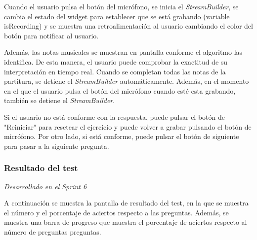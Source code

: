 Cuando el usuario pulsa el botón del micrófono, se inicia el \textit{StreamBuilder}, se cambia el estado del widget para establecer 
que se está grabando (variable isRecording) y se muestra una retroalimentación al usuario cambiando el color del botón para notificar al usuario.

Además, las notas musicales se muestran en pantalla conforme el algoritmo las identifica. De esta manera, el usuario puede comprobar la exactitud de su interpretación en tiempo real.
Cuando se completan todas las notas de la partitura, se detiene el \textit{StreamBuilder} automáticamente.
Además, en el momento en el que el usuario pulsa el botón del micrófono cuando esté esta grabando, también se detiene el \textit{StreamBuilder}.

Si el usuario no está conforme con la respuesta, puede pulsar el botón de "Reiniciar" para resetear el ejercicio y puede volver a grabar pulsando el botón de micrófono. 
Por otro lado, si está conforme, puede pulsar el botón de siguiente para pasar a la siguiente pregunta.

\subsubsection{Resultado del test}
\label{sec:pregunta}
\textit{Desarrollado en el Sprint 6}

A continuación se muestra la pantalla de resultado del test, en la que se muestra el número y el porcentaje de aciertos respecto a las preguntas. 
Además, se muestra una barra de progreso que muestra el porcentaje de aciertos respecto al número de preguntas preguntas.

